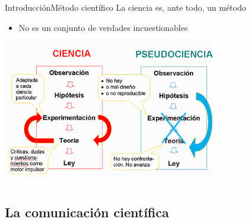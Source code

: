 \documentclass{beamer}
\begin{document}
\begin{frame}{Introducción}{Método científico}
  	 \vspace{-0.2cm}
	 La ciencia es, ante todo, un \alert{método}
		\begin{itemize}
			\item No es un conjunto de verdades incuestionables	
		\end{itemize}
  	 \vspace{-0.3cm}
 	 \begin{center}
   		\includegraphics[width=0.7\textwidth]{figs/metodo.png}
   	 \end{center}
\end{frame}

\subsection[Comunicación]{La comunicación científica}
\end{document}
